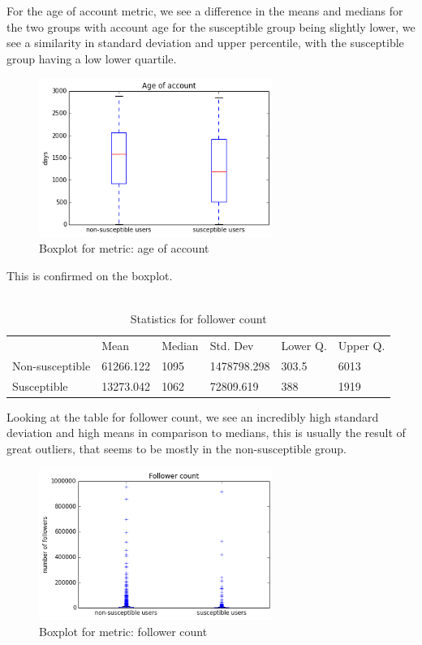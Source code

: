 \documentclass[10pt]{IEEEtran}
\begin{document}
For the age of account metric, we see a difference in the means and medians for the two groups with account age for the susceptible group being slightly lower, we see a similarity in standard deviation and upper percentile, with the susceptible group having a low lower quartile.
\begin{figure}[H]
  \centering
  \includegraphics[width=3.0in]{age_of_account_boxplot}
  \caption{Boxplot for metric: age of account}
  \label{fig:age_boxplot}
\end{figure}
This is confirmed on the boxplot.\\\\
\begin{table}[ht!]
\begin{tabular}{llllll}
\textbf{}       & Mean      & Median & Std. Dev    & Lower Q. & Upper Q. \\
Non-susceptible & 61266.122 & 1095   & 1478798.298 & 303.5    &  6013    \\
Susceptible     & 13273.042 & 1062   & 72809.619   & 388     &   1919   
\end{tabular}
\caption{Statistics for follower count}
\end{table}
Looking at the table for follower count, we see an incredibly high standard deviation and high means in comparison to medians, this is usually the result of great outliers, that seems to be mostly in the non-susceptible group.
\begin{figure}[H]
  \centering
  \includegraphics[width=3.0in]{follower_boxplot}
  \caption{Boxplot for metric: follower count}
  \label{fig:follower_boxplot}
\end{figure}
\end{document}
